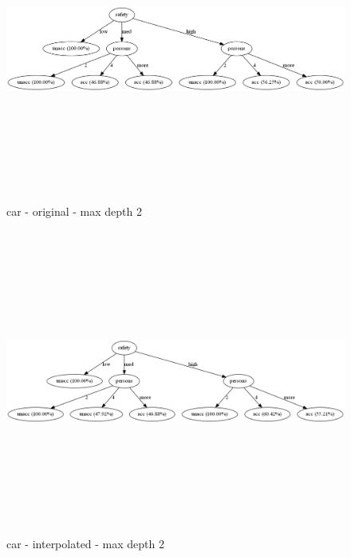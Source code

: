 \documentclass{sig-alternate}
\begin{document}
\clearpage
\begin{figure}[!t]
    \centering
    \includegraphics[width=1.00\textwidth,height=10cm,keepaspectratio]{./images/carD2Original.png}
    \caption{car - original - max depth 2}
    \label{figure:carD2Original}
\end{figure}
\begin{figure}[h]
    \centering
    \includegraphics[width=1.00\textwidth,height=10cm,keepaspectratio]{./images/carD2New.png}
    \caption{car - interpolated - max depth 2}
    \label{figure:carD2New}
\end{figure}
\end{document}
